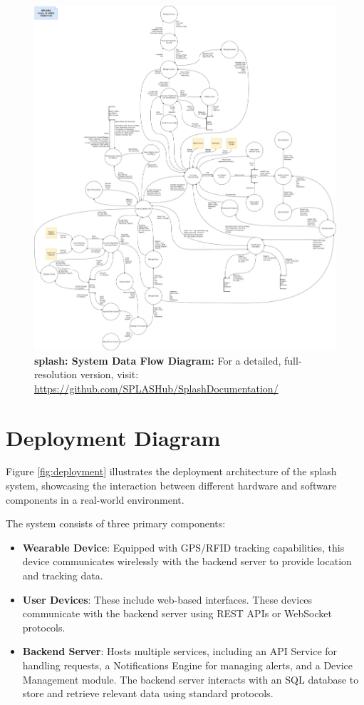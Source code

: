 \begin{figure}[H]
      \centering
      \includegraphics[width=16cm]{figs/data_flow.png}
      \caption{ \textbf{ \ac{splash}: System Data Flow Diagram:}  For a detailed, full-resolution version, visit: 
      \url{https://github.com/SPLASHub/SplashDocumentation/}}
      \label{fig:data_flow}
\end{figure}

\newpage
\section{Deployment Diagram}

Figure \ref{fig:deployment} illustrates the deployment architecture of the \ac{splash} system, showcasing the interaction between different hardware and software components in a real-world environment.

The system consists of three primary components:
\begin{itemize}
    \item \textbf{Wearable Device}: Equipped with GPS/RFID tracking capabilities, this device communicates wirelessly with the backend server to provide location and tracking data.
    
    \item \textbf{User Devices}: These include web-based interfaces. These devices communicate with the backend server using REST APIs or WebSocket protocols.
    
    \item \textbf{Backend Server}: Hosts multiple services, including an API Service for handling requests, a Notifications Engine for managing alerts, and a Device Management module. The backend server interacts with an SQL database to store and retrieve relevant data using standard protocols.
\end{itemize}


